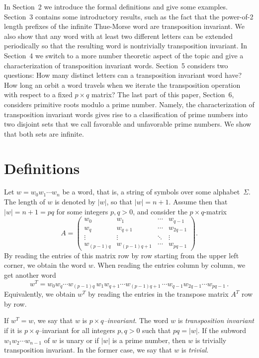 \documentclass{elsart}
\begin{document}
In Section~2 we introduce the formal definitions and give some examples. Section~3 contains some introductory results, such as the fact that the power-of-2 length prefixes of the infinite Thue-Morse word are transposition invariant. We also show that any word with at least two different letters can be extended periodically so that the resulting word is nontrivially  transposition invariant. In Section~4 we
switch to a more number theoretic aspect of the topic and give a characterization of transposition invariant words. Section~5 considers two questions:
How many distinct letters can a transposition invariant word have?
How long an orbit a word travels when we iterate the transposition operation with
respect to a  fixed $p\times q$ matrix? The last part of this paper, Section~6, considers primitive roots modulo a prime number. Namely, the characterization of transposition
invariant words gives rise to a classification of prime numbers into two disjoint sets that we call favorable and unfavorable prime numbers. We show that both sets are infinite.


\section{Definitions}

Let  $ w=w_0 w_1 \cdots w_n$ be a word, that is, a string of symbols over some alphabet~$\Sigma$. The length of $w$ is denoted by $|w|$, so that $|w|=n+1$.
 Assume then that
$|w|=n+1=pq$ for some integers
$p,q>0$, and consider the $p \times q$-matrix
$$
A= \left(
\begin{array}{cccc}
w_0 & w_1 & \cdots & w_{q-1} \\
w_q & w_{q+1} & \cdots & w_{2q-1} \\
\vdots & \vdots & \ddots & \vdots \\
w_{(p-1)q} &  w_{(p-1)q+1} & \cdots & w_{pq-1}
\end{array}
\right).
$$
By reading the entries of this matrix row by row starting from the upper
left corner, we obtain the word $w$. When reading the entries column by
column, we get another word
$$
w^T=w_0 w_q  \cdots w_{(p-1)q} \,  w_1 w_{q+1} \cdots w_{(p-1)q+1} \, \cdots
w_{q-1} w_{2q-1} \cdots w_{pq-1}\,.
$$
Equivalently, we obtain $w^T$ by reading the entries in the transpose matrix $A^T$ row by
row.

If $w^T =w $, we say that $w$ is {\em $p\times q$--invariant}. The word $w$ is
{\em transposition invariant} if it is
$p\times q$--invariant for all integers $p,q>0$ such that $pq= |w|$.
If the subword $w_1w_2 \cdots w_{n-1}$ of $w$ is unary or if $|w|$ is a prime number, then $w$ is
trivially transposition invariant. In the former case, we say that $w$ is {\em trivial}.
\end{document}
